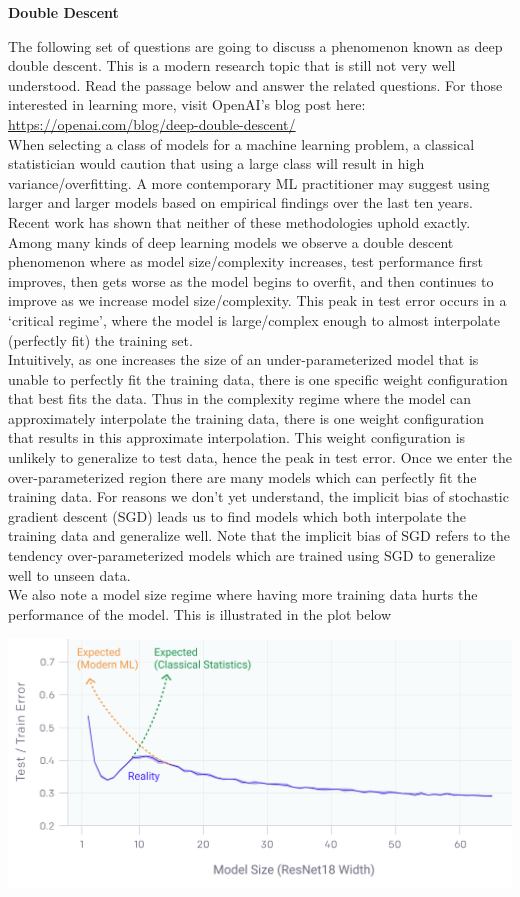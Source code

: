 \item {\bf Double Descent}

The following set of questions are going to discuss a phenomenon known as deep double descent. This is a modern research topic that is still not very well understood. Read the passage below and answer the related questions. For those interested in learning more, visit OpenAI’s blog post here: \url{https://openai.com/blog/deep-double-descent/}\\

When selecting a class of models for a machine learning problem, a classical statistician would caution that using a large class will result in high variance/overfitting. A more contemporary ML practitioner may suggest using larger and larger models based on empirical findings over the last ten years. Recent work has shown that neither of these methodologies uphold exactly. Among many kinds of deep learning models we observe a double descent phenomenon where as model size/complexity increases, test performance first improves, then gets worse as the model begins to overfit, and then continues to improve as we increase model size/complexity. This peak in test error occurs in a ‘critical regime’, where the model is large/complex enough to almost interpolate (perfectly fit) the training set. \\

Intuitively, as one increases the size of an under-parameterized model that is unable to perfectly fit the training data, there is one specific weight configuration that best fits the data. Thus in the complexity regime where the model can approximately interpolate the training data, there is one weight configuration that results in this approximate interpolation. This weight configuration is unlikely to generalize to test data, hence the peak in test error. Once we enter the over-parameterized region there are many models which can perfectly fit the training data. For reasons we don’t yet understand, the implicit bias of stochastic gradient descent (SGD) leads us to find models which both interpolate the training data and generalize well. Note that the implicit bias of SGD refers to the tendency over-parameterized models which are trained using SGD to generalize well to unseen data. \\

We also note a model size regime where having more training data hurts the performance of the model. This is illustrated in the plot below
\begin{center}
    \includegraphics[scale=0.3]{double-descent/dd.png}
\end{center}


